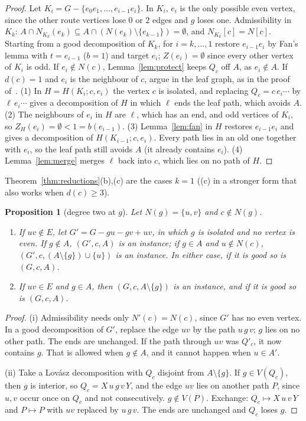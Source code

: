 \documentclass[11pt]{amsart}
\newtheorem{proposition}[theorem]{Proposition}
\theoremstyle{definition}
\begin{document}
\begin{proof}
Let $K_i=G-\{e_0e_1,\dots,e_{i-1}e_i\}$. In $K_i$, $e_i$ is the only possible even vertex, since the
other route vertices lose $0$ or $2$ edges and $g$ loses one. Admissibility in $K_k$:
$A\cap N_{K_k}(e_k)\subseteq A\cap(N(e_k)\setminus\{e_{k-1}\})=\emptyset$, and $N_{K_k}[c]=N[c]$.
Starting from a good decomposition of $K_k$, for $i=k,\dots,1$ restore $e_{i-1}e_i$ by Fan's lemma
with $t=e_{i-1}$ ($b=1$) and target $e_i$; $Z(e_i)=\emptyset$ since every other vertex of $K_i$ is
odd. If $e_i\notin N(c)$, Lemma~\ref{lem:protect} keeps $Q_c$ off $A$, as $e_i\notin A$. If $d(c)=1$
and $e_i$ is the neighbour of $c$, argue in the leaf graph, as in the proof of~\cite[Lemma~4.1]{PE}.
(1) In $H=H(K_i;c,e_i)$ the vertex $c$ is isolated, and replacing $Q_c=c\,e_i\cdots$ by
$\ell\,e_i\cdots$ gives a decomposition of $H$ in which $\ell$ ends the leaf path, which avoids $A$.
(2) The neighbours of $e_i$ in $H$ are $\ell$, which has an end, and odd vertices of $K_i$, so
$Z_H(e_i)=\emptyset<1=b(e_{i-1})$. (3) Lemma~\ref{lem:fan} in $H$ restores $e_{i-1}e_i$ and gives a
decomposition of $H(K_{i-1};c,e_i)$. Every path lies in an old one together with $e_i$, so the leaf
path still avoids $A$ (it already contains $e_i$). (4) Lemma~\ref{lem:merge} merges $\ell$ back into
$c$, which lies on no path of $H$.
\end{proof}

Theorem~\ref{thm:reductions}(b),(c) are the cases $k=1$ ((c) in a stronger form that also works
when $d(c)\ge3$).

\begin{proposition}[degree two at $g$]\label{prop:deg2}
Let $N(g)=\{u,v\}$ and $c\notin N(g)$.
\begin{enumerate}
\item[(i)] If $uv\notin E$, let $G'=G-gu-gv+uv$, in which $g$ is isolated and no vertex is even. If
$g\notin A$, $(G',c,A)$ is an instance; if $g\in A$ and $u\notin N(c)$, $(G',c,(A\setminus\{g\})\cup\{u\})$
is an instance. In either case, if it is good so is $(G,c,A)$.
\item[(ii)] If $uv\in E$ and $g\in A$, then $(G,c,A\setminus\{g\})$ is an instance, and if it is good
so is $(G,c,A)$.
\end{enumerate}
\end{proposition}

\begin{proof}
(i) Admissibility needs only $N'(c)=N(c)$, since $G'$ has no even vertex. In a good decomposition of
$G'$, replace the edge $uv$ by the path $u\,g\,v$; $g$ lies on no other path. The ends are unchanged.
If the path through $uv$ was $Q'_c$, it now contains $g$. That is allowed when $g\notin A$, and it
cannot happen when $u\in A'$.

(ii) Take a Lov\'asz decomposition with $Q_c$ disjoint from $A\setminus\{g\}$. If $g\in V(Q_c)$, then
$g$ is interior, so $Q_c=X\,u\,g\,v\,Y$, and the edge $uv$ lies on another path $P$, since $u,v$ occur
once on $Q_c$ and not consecutively. $g\notin V(P)$. Exchange: $Q_c\mapsto X\,u\,v\,Y$ and
$P\mapsto P$ with $uv$ replaced by $u\,g\,v$. The ends are unchanged and $Q_c$ loses $g$.
\end{proof}
\end{document}
